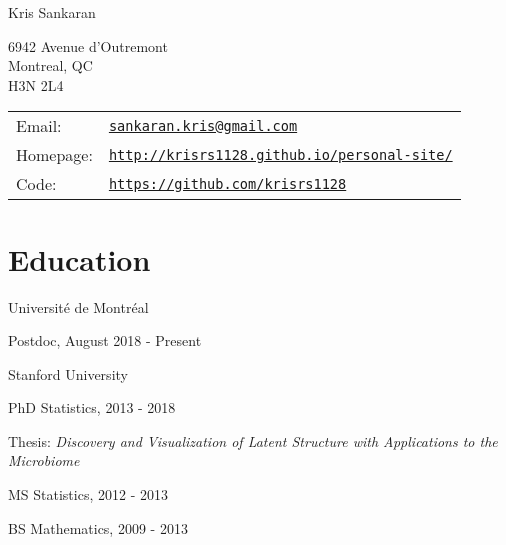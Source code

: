 \documentclass[letterpaper]{article}
\def\name{Kris Sankaran}
\renewenvironment{itemize}{
  \begin{list}{}{
    \setlength{\leftmargin}{1.5em}
  }
}{
  \end{list}
}
\begin{document}
{\huge \name}


\vspace{0.25in}

\begin{minipage}{0.45\linewidth}
  6942 Avenue d'Outremont\\
  Montreal, QC \\
  H3N 2L4
\end{minipage}
\begin{minipage}{0.45\linewidth}
  \begin{tabular}{ll}
    Email: & \href{mailto:sankaran.kris@gmail.com}{\tt sankaran.kris@gmail.com} \\
    Homepage: & \href{http://krisrs1128.github.io/personal-site/}{\tt http://krisrs1128.github.io/personal-site/} \\
    Code: & \href{https://github.com/krisrs1128}{\tt https://github.com/krisrs1128}
  \end{tabular}
\end{minipage}

\section*{Education}
Universit\'e de Montr\'eal
\begin{itemize}
  \item Postdoc, August 2018 - Present
\end{itemize}

Stanford University
\begin{itemize}
  \item PhD Statistics, 2013 - 2018
    \begin{itemize}
    \item Thesis: \textit{Discovery and Visualization of Latent Structure with Applications to the Microbiome}
    \end{itemize}
  \item MS Statistics, 2012 - 2013
  \item BS Mathematics, 2009 - 2013
\end{itemize}
\end{document}
